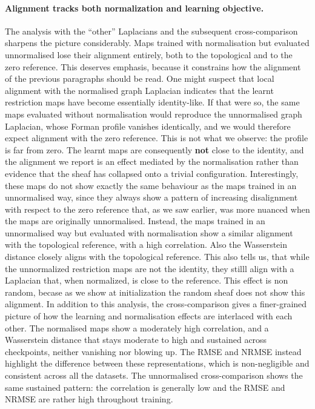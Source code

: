 \paragraph{Alignment tracks both normalization and learning objective.}
The analysis with the ``other'' Laplacians and the subsequent cross-comparison sharpens the picture considerably.
Maps trained with normalisation but evaluated unnormalised lose their alignment entirely, both to the topological and to the zero reference.
This deserves emphasis, because it constrains how the alignment of the previous paragraphs should be read.
One might suspect that local alignment with the normalised graph Laplacian indicates that the learnt restriction maps have become essentially identity-like.
If that were so, the same maps evaluated without normalisation would reproduce the unnormalised graph Laplacian, whose Forman profile vanishes identically, and we would therefore expect alignment with the zero reference.
This is not what we observe: the profile is far from zero.
The learnt maps are consequently \textbf{not} close to the identity, and the alignment we report is an effect mediated by the normalisation rather than evidence that the sheaf has collapsed onto a trivial configuration.
Interestingly, these maps do not show exactly the same behaviour as the maps trained in an unnormalised way, since they always show a pattern of increasing disalignment with respect to the zero reference that, as we saw earlier, was more nuanced when the maps are originally unnormalised.
Instead, the maps trained in an unnormalised way but evaluated with normalisation show a similar alignment with the topological reference, with a high correlation. Also the Wasserstein distance closely aligns with the topological reference. 
This also tells us, that while the unnormalized restriction maps are not the identity, they stilll align with a Laplacian that, when normalized, is close to the reference. 
This effect is non random, becase as we show at initialization the random sheaf does not show this alignment. 
In addition to this analysis, the cross-comparison gives a finer-grained picture of how the learning and normalisation effects are interlaced with each other.
The normalised maps show a moderately high correlation, and a Wasserstein distance that stays moderate to high and sustained across checkpoints, neither vanishing nor blowing up.
The RMSE and NRMSE instead highlight the difference between these representations, which is non-negligible and consistent across all the datasets.
The unnormalised cross-comparison shows the same sustained pattern: the correlation is generally low and the RMSE and NRMSE are rather high throughout training.
